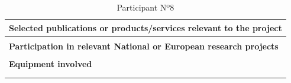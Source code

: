 \begin{longtable}[H]{|p{0.7cm}|p{4cm}|p{7cm}|p{1.3cm}|}
	\multicolumn{4}{|p{13cm}|}{\textbf{Selected publications or products/services relevant to the project}}  \\ \hline
	
	\multicolumn{4}{|p{13cm}|}{}  \\ \hline
	
	\multicolumn{4}{|p{13cm}|}{\textbf{Participation in relevant National or European research projects}}  \\ \hline
	
	\multicolumn{4}{|p{13cm}|}{}  \\ \hline
	
	\multicolumn{4}{|p{13cm}|}{\textbf{Equipment involved}}  \\ \hline
	
	\multicolumn{4}{|p{13cm}|}{}  \\ \hline
	\caption{Participant Nº8}
\end{longtable}